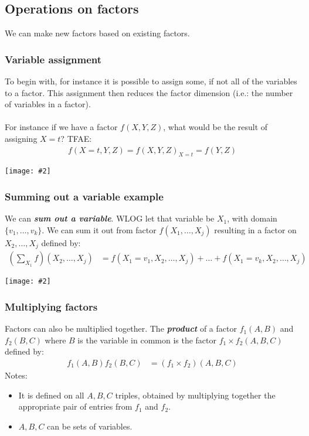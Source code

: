 \documentclass{article}
\newcommand{\centerfig}[2]{\begin{center}\texttt{[image: \#2]}\end{center}}
\begin{document}
\subsection*{Operations on factors}
We can make new factors based on existing factors. 
\subsubsection*{Variable assignment}
To begin with, for instance it is possible to assign some, if not all of the variables to a factor. This assignment then reduces the factor dimension (i.e.: the number of variables in a factor). \\
\\
For instance if we have a factor $ f(X,Y,Z) $, what would be the result of assigning $ X = t $? TFAE:
\begin{align*}
f(X=t, Y, Z) = f(X,Y,Z)_{X=t} = f(Y,Z)
\end{align*}
\centerfig{0.3}{BNet-4}
\subsubsection*{Summing out a variable example}
We can \textbf{\textit{sum out a variable}}. WLOG let that variable be $ X_1 $, with domain $ \{v_1, \dots, v_k\} $. We can sum it out from factor $ f(X_1, \dots, X_j) $ resulting in a factor on $ X_2, \dots, X_j $ defined by:
\begin{align*}
\left( \sum_{X_1} f \right)\left( X_2, \dots, X_j \right) &= f(X_1 = v_1,X_2, \dots, X_j) + \dots + f(X_1 = v_k,X_2, \dots, X_j)
\end{align*}
\centerfig{0.8}{BNet-5}
\subsubsection*{Multiplying factors}
Factors can also be multiplied together. The \textbf{\textit{product}} of a factor $ f_1(A,B) $ and $ f_2(B,C) $ where $ B $ is the variable in common is the factor $ f_1 \times f_2(A,B,C) $ defined by:
\begin{align*}
 f_1(A,B) f_2(B,C) &= (f_1 \times f_2)(A,B,C)
\end{align*}
Notes:
\begin{itemize}
	\item It is defined on all $ A,B,C $ triples, obtained by multiplying together the appropriate pair of entries from $ f_1 $ and $ f_2 $.
	\item $ A,B,C $ can be sets of variables.
\end{itemize}
\end{document}
